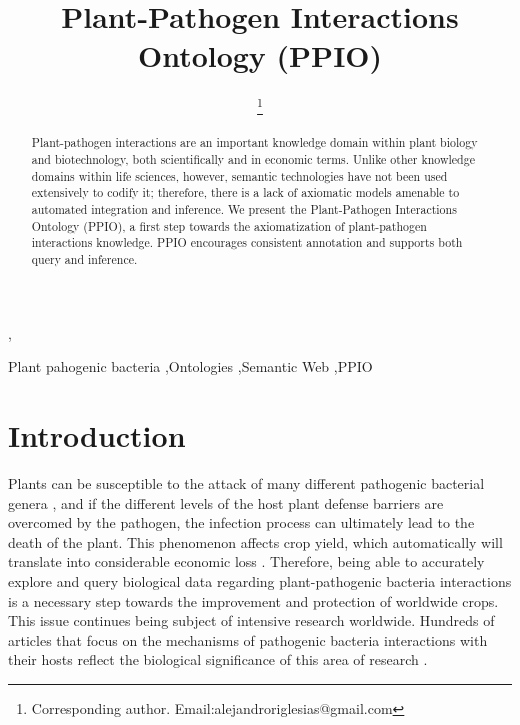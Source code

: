 \documentclass[sw]{iosart2c}
\begin{document}
\begin{frontmatter}

\title{Plant-Pathogen Interactions Ontology (PPIO)}
\runningtitle{}




\author[A]{ \thanks{Corresponding author. Email:alejandroriglesias@gmail.com}},
\author[A]{ }
\author[A]{ }
\author[A]{ }
\runningauthor{}
\address[A]{Biological Informatics Group, Centre for Plant Biotechnology and Genomics (CBGP), Technical University of Madrid (UPM), Spain}

\begin{abstract}
Plant-pathogen interactions are an important knowledge domain within plant biology and biotechnology, both scientifically and in economic terms. Unlike other knowledge domains within   life sciences, however, semantic technologies have not been used extensively to codify it; therefore, there is a lack of axiomatic models amenable to automated integration and inference. We present the Plant-Pathogen Interactions Ontology (PPIO), a first step towards the axiomatization of plant-pathogen interactions knowledge. PPIO encourages consistent annotation and supports both query and inference.
\end{abstract}

\begin{keyword}
 Plant pahogenic bacteria \sep Ontologies \sep Semantic Web \sep PPIO
\end{keyword}

\end{frontmatter}


\section{Introduction}\label{s1}

Plants can be susceptible to the attack of many different pathogenic bacterial genera \cite{Mansfield}, and if the different levels of the host plant defense barriers are overcomed by the pathogen, the infection process can ultimately lead to the death of the plant. This phenomenon affects crop yield, which automatically will translate into considerable economic loss \cite{Montesinos}. Therefore, being able to accurately explore and query biological data regarding plant-pathogenic bacteria interactions is a necessary step towards the improvement and protection of worldwide crops. This issue continues being subject of intensive research worldwide. Hundreds of articles that focus on the mechanisms of pathogenic bacteria interactions with their hosts reflect the biological significance of this area of research \cite{DeWit} \cite {Dodds}. 
\end{document}

